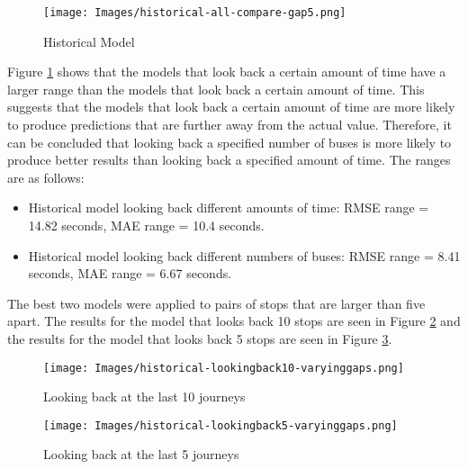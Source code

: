 \begin{figure}[H]
\begin{center}
    \texttt{[image: Images/historical-all-compare-gap5.png]}
    \caption{Historical Model}
    \label{fig:historical-gap5-all-compare}
\end{center}
\end{figure}

Figure \ref{fig:historical-gap5-all-compare} shows that the models that look back a certain amount of time have a larger range than the models that look back a certain amount of time. This suggests that the models that look back a certain amount of time are more likely to produce predictions that are further away from the actual value. Therefore, it can be concluded that looking back a specified number of buses is more likely to produce better results than looking back a specified amount of time. The ranges are as follows:

\begin{itemize}
    \item Historical model looking back different amounts of time: RMSE range = 14.82 seconds, MAE range = 10.4 seconds.
    \item Historical model looking back different numbers of buses: RMSE range = 8.41 seconds, MAE range = 6.67 seconds.
\end{itemize}

The best two models were applied to pairs of stops that are larger than five apart. The results for the model that looks back 10 stops are seen in Figure \ref{fig:historical-allgals-lookback10} and the results for the model that looks back 5 stops are seen in Figure \ref{fig:historical-allgaps-lookback5}. 

\begin{figure}[H]
\begin{center}
    \texttt{[image: Images/historical-lookingback10-varyinggaps.png]}
    \caption{Looking back at the last 10 journeys}
    \label{fig:historical-allgals-lookback10}
\end{center}
\end{figure}

\begin{figure}[H]
\begin{center}
    \texttt{[image: Images/historical-lookingback5-varyinggaps.png]}
    \caption{Looking back at the last 5 journeys}
    \label{fig:historical-allgaps-lookback5}
\end{center}
\end{figure}

